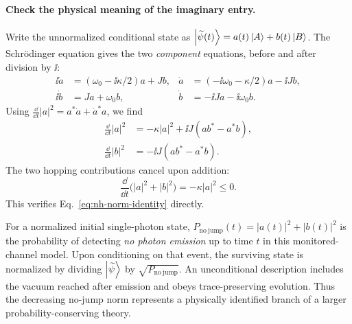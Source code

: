 \paragraph{Check the physical meaning of the imaginary entry.}
Write the unnormalized conditional state as
$\left|\widetilde\psi(t)\right\rangle=a(t)\left|A\right\rangle+b(t)\left|B\right\rangle$.
The Schr\"odinger equation gives the two \emph{component}
equations, before and after division by $\ii$:
\begin{equation}
\begin{aligned}
\ii\dot a&=(\omega_0-\ii\kappa/2)a+Jb,
&\dot a&=(-\ii\omega_0-\kappa/2)a-\ii Jb,\\
\ii\dot b&=Ja+\omega_0 b,
&\dot b&=-\ii Ja-\ii\omega_0 b.
\end{aligned}
\end{equation}
Using $\frac{\dd}{\dd t}|a|^2=a^*\dot a+\dot a^*a$,
we find
\begin{align}
\frac{\dd}{\dd t}|a|^2
 &=-\kappa|a|^2+\ii J(ab^*-a^*b),\\
\frac{\dd}{\dd t}|b|^2
 &=-\ii J(ab^*-a^*b).
\end{align}
The two hopping contributions cancel upon addition:
\begin{equation}
\boxed{\frac{\dd}{\dd t}\bigl(|a|^2+|b|^2\bigr)
=-\kappa|a|^2\leq0.}
\label{eq:nh-survival}
\end{equation}
This verifies Eq.~\eqref{eq:nh-norm-identity} directly.

For a normalized initial single-photon state,
$P_{\mathrm{no\ jump}}(t)=|a(t)|^2+|b(t)|^2$
is the probability of detecting \emph{no photon emission} up
to time $t$ in this monitored-channel model. Upon conditioning
on that event, the surviving state is normalized by dividing
$\left|\widetilde\psi\right\rangle$ by $\sqrt{P_{\mathrm{no\ jump}}}$.
An unconditional description includes the vacuum reached
after emission and obeys trace-preserving evolution.
Thus the decreasing no-jump norm represents a physically
identified branch of a larger probability-conserving theory.

